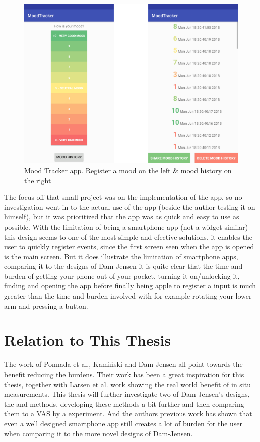 \begin{figure}[h!]
    \centering
    \includegraphics[width=.8\textwidth]{figures/mood.png}
    \caption{Mood Tracker app. Register a mood on the left \& mood history on the right\cite{mood}}
    \label{mood}
\end{figure}

The focus off that small project was on the implementation of the app, so no investigation went in to the actual use of the app (beside the author testing it on himself), but it was prioritized that the app was as quick and easy to use as possible. With the limitation of being a smartphone app (not a widget similar) this design seems to one of the most simple and efective solutions, it enables the user to quickly register events, since the first screen seen when the app is opened is the main screen. But it does illustrate the limitation of smartphone apps, comparing it to the designs of Dam-Jensen it is quite clear that the time and burden of getting your phone out of your pocket, turning it on/unlocking it, finding and opening the app before finally being apple to register a input is much greater than the time and burden involved with for example rotating your lower arm and pressing a button. 



\section{Relation to This Thesis}
The work of Ponnada et al.\cite{compare}, Kami\'nski\cite{tomas} and Dam-Jensen\cite{dam} all point towards the benefit reducing the burdens. Their work has been a great inspiration for this thesis, together with Larsen et al. work showing the real world benefit of in situ measurements. This thesis will further investigate two of Dam-Jensen's designs, the  and  methods, developing these methods a bit further and then comparing them to a VAS by a  experiment. And the authors previous work has shown that even a well designed smartphone app still creates a lot of burden for the user when comparing it to the more novel designs of Dam-Jensen\cite{dam}.